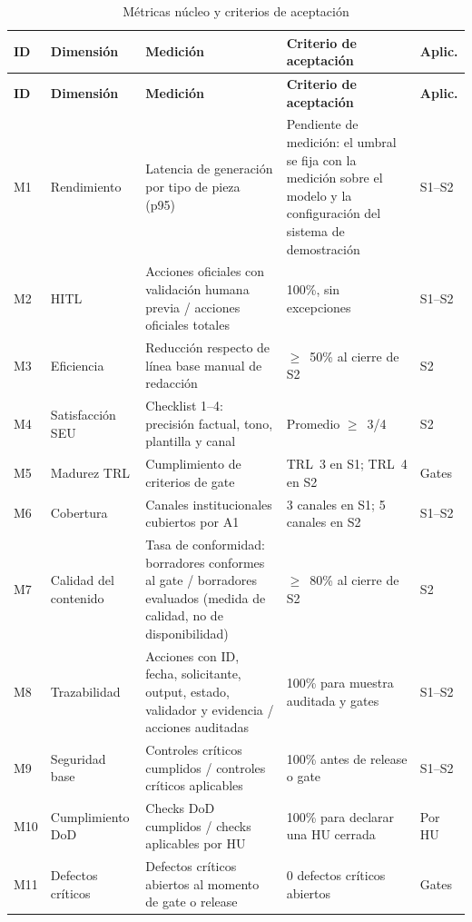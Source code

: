 \documentclass[a4paper, 12pt]{article}
\begin{document}
{\footnotesize
\begin{longtable}{L{0.05\textwidth}L{0.16\textwidth}L{0.28\textwidth}L{0.29\textwidth}L{0.07\textwidth}}
  \caption{M\'etricas n\'ucleo y criterios de aceptaci\'on}
  \label{tab:criterios-aceptacion}\\
    \toprule
    \textbf{ID} & \textbf{Dimensi\'on} & \textbf{Medici\'on} & \textbf{Criterio de aceptaci\'on} & \textbf{Aplic.} \\
    \midrule
    \endfirsthead
    \toprule
    \textbf{ID} & \textbf{Dimensi\'on} & \textbf{Medici\'on} & \textbf{Criterio de aceptaci\'on} & \textbf{Aplic.} \\
    \midrule
    \endhead
    M1 & Rendimiento & Latencia de generaci\'on por tipo de pieza (p95) & Pendiente de medici\'on: el umbral se fija con la medici\'on sobre el modelo y la configuraci\'on del sistema de demostraci\'on & S1--S2 \\
    M2 & \ac{HITL} & Acciones oficiales con validaci\'on humana previa / acciones oficiales totales & 100\%, sin excepciones & S1--S2 \\
    M3 & Eficiencia & Reducci\'on respecto de l\'inea base manual de redacci\'on & $\geq$~50\% al cierre de S2 & S2 \\
    M4 & Satisfacci\'on \ac{SEU} & Checklist 1--4: precisi\'on factual, tono, plantilla y canal & Promedio $\geq$~3/4 & S2 \\
    M5 & Madurez \ac{TRL} & Cumplimiento de criterios de gate & \ac{TRL}~3 en S1; \ac{TRL}~4 en S2 & Gates \\
    M6 & Cobertura & Canales institucionales cubiertos por A1 & 3 canales en S1; 5 canales en S2 & S1--S2 \\
    M7 & Calidad del contenido & Tasa de conformidad: borradores conformes al gate / borradores evaluados (medida de calidad, no de disponibilidad) & $\geq$~80\% al cierre de S2 & S2 \\
    M8 & Trazabilidad & Acciones con ID, fecha, solicitante, output, estado, validador y evidencia / acciones auditadas & 100\% para muestra auditada y gates & S1--S2 \\
    M9 & Seguridad base & Controles cr\'iticos cumplidos / controles cr\'iticos aplicables & 100\% antes de release o gate & S1--S2 \\
    M10 & Cumplimiento \ac{DoD} & Checks \ac{DoD} cumplidos / checks aplicables por \ac{HU} & 100\% para declarar una \ac{HU} cerrada & Por \ac{HU} \\
    M11 & Defectos cr\'iticos & Defectos cr\'iticos abiertos al momento de gate o release & 0 defectos cr\'iticos abiertos & Gates \\

\end{longtable}}
\end{document}
